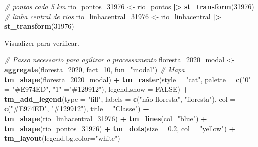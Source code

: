 \documentclass[
]{article}
\newenvironment{Shaded}{\begin{snugshade}}{\end{snugshade}}
\newcommand{\AttributeTok}[1]{\textcolor[rgb]{0.13,0.29,0.53}{#1}}
\newcommand{\CommentTok}[1]{\textcolor[rgb]{0.56,0.35,0.01}{\textit{#1}}}
\newcommand{\ConstantTok}[1]{\textcolor[rgb]{0.56,0.35,0.01}{#1}}
\newcommand{\DecValTok}[1]{\textcolor[rgb]{0.00,0.00,0.81}{#1}}
\newcommand{\FloatTok}[1]{\textcolor[rgb]{0.00,0.00,0.81}{#1}}
\newcommand{\FunctionTok}[1]{\textcolor[rgb]{0.13,0.29,0.53}{\textbf{#1}}}
\newcommand{\NormalTok}[1]{#1}
\newcommand{\OtherTok}[1]{\textcolor[rgb]{0.56,0.35,0.01}{#1}}
\newcommand{\SpecialCharTok}[1]{\textcolor[rgb]{0.81,0.36,0.00}{\textbf{#1}}}
\newcommand{\StringTok}[1]{\textcolor[rgb]{0.31,0.60,0.02}{#1}}
\begin{document}
\begin{Shaded}
\begin{Highlighting}[]
\CommentTok{\# pontos cada 5 km}
\NormalTok{rio\_pontos\_31976 }\OtherTok{\textless{}{-}}\NormalTok{ rio\_pontos }\SpecialCharTok{|\textgreater{}} 
  \FunctionTok{st\_transform}\NormalTok{(}\DecValTok{31976}\NormalTok{) }
\CommentTok{\# linha central de rios}
\NormalTok{rio\_linhacentral\_31976 }\OtherTok{\textless{}{-}}\NormalTok{ rio\_linhacentral }\SpecialCharTok{|\textgreater{}} 
  \FunctionTok{st\_transform}\NormalTok{(}\DecValTok{31976}\NormalTok{) }
\end{Highlighting}
\end{Shaded}

\newpage

Visualizer para verificar.

\begin{Shaded}
\begin{Highlighting}[]
\CommentTok{\# Passo necessario para agilizar o processamento}
\NormalTok{floresta\_2020\_modal }\OtherTok{\textless{}{-}} \FunctionTok{aggregate}\NormalTok{(floresta\_2020, }
                                 \AttributeTok{fact=}\DecValTok{10}\NormalTok{, }
                                 \AttributeTok{fun=}\StringTok{"modal"}\NormalTok{)}
\CommentTok{\# Mapa}
\FunctionTok{tm\_shape}\NormalTok{(floresta\_2020\_modal) }\SpecialCharTok{+}
  \FunctionTok{tm\_raster}\NormalTok{(}\AttributeTok{style =} \StringTok{"cat"}\NormalTok{, }
            \AttributeTok{palette =} \FunctionTok{c}\NormalTok{(}\StringTok{"0"} \OtherTok{=} \StringTok{"\#E974ED"}\NormalTok{, }\StringTok{"1"} \OtherTok{=}\StringTok{"\#129912"}\NormalTok{), }\AttributeTok{legend.show =} \ConstantTok{FALSE}\NormalTok{) }\SpecialCharTok{+} 
  \FunctionTok{tm\_add\_legend}\NormalTok{(}\AttributeTok{type =} \StringTok{"fill"}\NormalTok{, }\AttributeTok{labels =} \FunctionTok{c}\NormalTok{(}\StringTok{"não{-}floresta"}\NormalTok{, }\StringTok{"floresta"}\NormalTok{),}
    \AttributeTok{col =} \FunctionTok{c}\NormalTok{(}\StringTok{"\#E974ED"}\NormalTok{, }\StringTok{"\#129912"}\NormalTok{), }\AttributeTok{title =} \StringTok{"Classe"}\NormalTok{) }\SpecialCharTok{+} 
\FunctionTok{tm\_shape}\NormalTok{(rio\_linhacentral\_31976) }\SpecialCharTok{+} 
  \FunctionTok{tm\_lines}\NormalTok{(}\AttributeTok{col=}\StringTok{"blue"}\NormalTok{) }\SpecialCharTok{+} 
\FunctionTok{tm\_shape}\NormalTok{(rio\_pontos\_31976) }\SpecialCharTok{+} 
  \FunctionTok{tm\_dots}\NormalTok{(}\AttributeTok{size =} \FloatTok{0.2}\NormalTok{, }\AttributeTok{col =} \StringTok{"yellow"}\NormalTok{) }\SpecialCharTok{+} 
\FunctionTok{tm\_layout}\NormalTok{(}\AttributeTok{legend.bg.color=}\StringTok{"white"}\NormalTok{)}
\end{Highlighting}
\end{Shaded}
\end{document}
